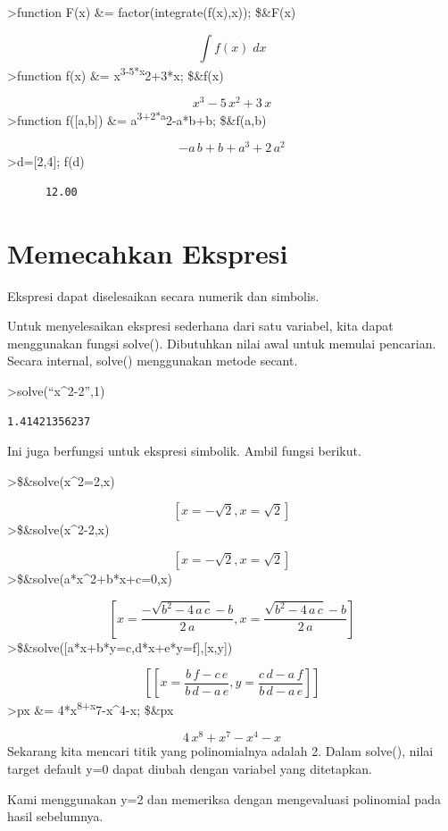 \documentclass[
]{book}
\begin{document}
\textgreater function F(x) \&= factor(integrate(f(x),x)); \$\&F(x)

\[\int {f\left(x\right)}{\;dx}\]\textgreater function f(x) \&= x\textsuperscript{3-5*x}2+3*x; \$\&f(x)

\[x^3-5\,x^2+3\,x\]\textgreater function f({[}a,b{]}) \&= a\textsuperscript{3+2*a}2-a*b+b; \$\&f(a,b)

\[-a\,b+b+a^3+2\,a^2\]\textgreater d={[}2,4{]}; f(d)

\begin{verbatim}
      12.00 
\end{verbatim}

\chapter{Memecahkan Ekspresi}\label{memecahkan-ekspresi}

Ekspresi dapat diselesaikan secara numerik dan simbolis.

Untuk menyelesaikan ekspresi sederhana dari satu variabel, kita dapat menggunakan fungsi solve(). Dibutuhkan nilai awal untuk memulai pencarian. Secara internal, solve() menggunakan metode secant.

\textgreater solve(``x\^{}2-2'',1)

\begin{verbatim}
1.41421356237
\end{verbatim}

Ini juga berfungsi untuk ekspresi simbolik. Ambil fungsi berikut.

\textgreater\$\&solve(x\^{}2=2,x)

\[\left[ x=-\sqrt{2} , x=\sqrt{2} \right] \]\textgreater\$\&solve(x\^{}2-2,x)

\[\left[ x=-\sqrt{2} , x=\sqrt{2} \right] \]\textgreater\$\&solve(a*x\^{}2+b*x+c=0,x)

\[\left[ x=\frac{-\sqrt{b^2-4\,a\,c}-b}{2\,a} , x=\frac{\sqrt{b^2-4\,  a\,c}-b}{2\,a} \right] \]\textgreater\$\&solve({[}a*x+b*y=c,d*x+e*y=f{]},{[}x,y{]})

\[\left[ \left[ x=\frac{b\,f-c\,e}{b\,d-a\,e} , y=\frac{c\,d-a\,f}{b  \,d-a\,e} \right]  \right] \]\textgreater px \&= 4*x\textsuperscript{8+x}7-x\^{}4-x; \$\&px

\[4\,x^8+x^7-x^4-x\]Sekarang kita mencari titik yang polinomialnya adalah 2. Dalam solve(), nilai target default y=0 dapat diubah dengan variabel yang ditetapkan.

Kami menggunakan y=2 dan memeriksa dengan mengevaluasi polinomial pada hasil sebelumnya.
\end{document}
